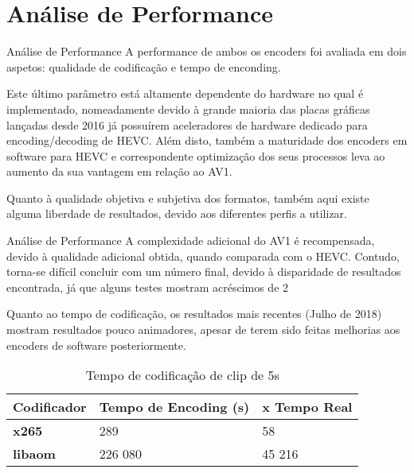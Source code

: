 \documentclass{beamer}
\begin{document}
\section{Análise de Performance}
\begin{frame}{Análise de Performance}
	A performance de ambos os encoders foi avaliada em dois aspetos: qualidade de codificação e tempo de enconding.

	Este último parâmetro está altamente dependente do hardware no qual é implementado, nomeadamente devido à grande maioria das placas gráficas lançadas desde 2016 já possuírem aceleradores de hardware dedicado para encoding/decoding de HEVC. Além disto, também a maturidade dos encoders em software para HEVC e correspondente optimização dos seus processos leva ao aumento da sua vantagem em relação ao AV1.

	Quanto à qualidade objetiva e subjetiva dos formatos, também aqui existe alguma liberdade de resultados, devido aos diferentes perfis a utilizar.
\end{frame}

\begin{frame}{Análise de Performance}
	A complexidade adicional do AV1 é recompensada, devido à qualidade adicional obtida, quando comparada com o HEVC. Contudo, torna-se difícil concluir com um número final, devido à disparidade de resultados encontrada, já que alguns testes mostram acréscimos de 2%

	Quanto ao tempo de codificação, os resultados mais recentes (Julho de 2018) mostram resultados pouco animadores, apesar de terem sido feitas melhorias aos encoders de software posteriormente.

	\begin{table}
		\centering
		\begin{tabular}{l|l|l}
			\textbf{Codificador}		 													& \textbf{Tempo de Encoding (s)} 	& \textbf{x Tempo Real} \\\hline
			\textbf{x265}																			& 289			 												& 58 \\
			\textbf{libaom}																		&	226 080													& 45 216 \\
		\end{tabular}
		\caption{\label{tab:time}Tempo de codificação de clip de 5s}
	\end{table}


\end{frame}
\end{document}
